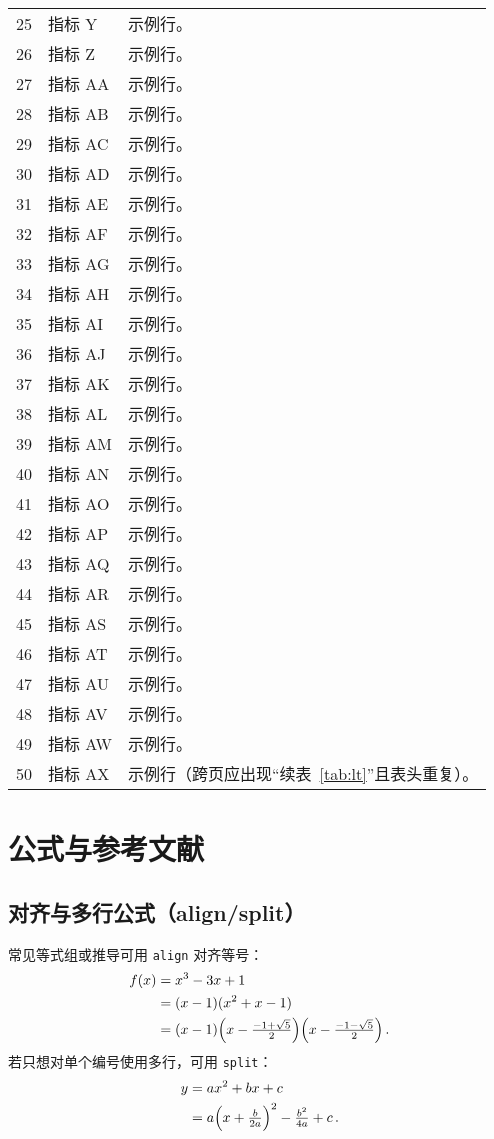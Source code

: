 \begin{longtable}{p{2.2cm} p{3.2cm} p{6.5cm}}
  25 & 指标 Y & 示例行。 \\
  26 & 指标 Z & 示例行。 \\
  27 & 指标 AA & 示例行。 \\
  28 & 指标 AB & 示例行。 \\
  29 & 指标 AC & 示例行。 \\
  30 & 指标 AD & 示例行。 \\
  31 & 指标 AE & 示例行。 \\
  32 & 指标 AF & 示例行。 \\
  33 & 指标 AG & 示例行。 \\
  34 & 指标 AH & 示例行。 \\
  35 & 指标 AI & 示例行。 \\
  36 & 指标 AJ & 示例行。 \\
  37 & 指标 AK & 示例行。 \\
  38 & 指标 AL & 示例行。 \\
  39 & 指标 AM & 示例行。 \\
  40 & 指标 AN & 示例行。 \\
  41 & 指标 AO & 示例行。 \\
  42 & 指标 AP & 示例行。 \\
  43 & 指标 AQ & 示例行。 \\
  44 & 指标 AR & 示例行。 \\
  45 & 指标 AS & 示例行。 \\
  46 & 指标 AT & 示例行。 \\
  47 & 指标 AU & 示例行。 \\
  48 & 指标 AV & 示例行。 \\
  49 & 指标 AW & 示例行。 \\
  50 & 指标 AX & 示例行（跨页应出现“续表~\ref{tab:lt}”且表头重复）。 \\
\end{longtable}

\section{公式与参考文献}

\subsection{对齐与多行公式（align/split）}
常见等式组或推导可用 \verb|align| 对齐等号：
\begin{align}
  f(x)
    &= x^3 - 3x + 1 \\
    &= (x-1)(x^2 + x - 1) \\
    &= (x-1)\Bigl(x - \tfrac{-1+\sqrt{5}}{2}\Bigr)\Bigl(x - \tfrac{-1-\sqrt{5}}{2}\Bigr)\,.
\end{align}
若只想对单个编号使用多行，可用 \verb|split|：
\begin{equation}\label{eq:split-demo}
  \begin{split}
    y 
      &= ax^2 + bx + c \\
      &= a\Bigl(x + \tfrac{b}{2a}\Bigr)^2 - \tfrac{b^2}{4a} + c\,.
  \end{split}
\end{equation}


